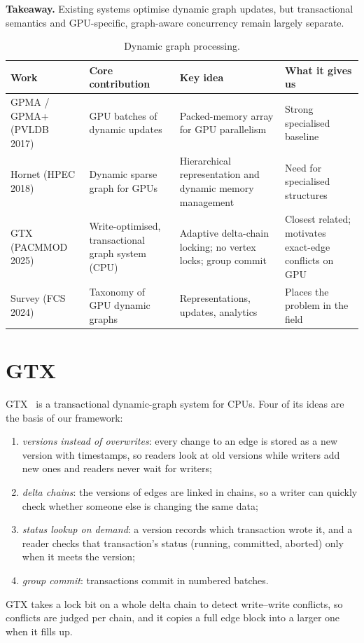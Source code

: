 \documentclass[11pt,a4paper,oneside]{report}
\begin{document}
\textbf{Takeaway.} Existing systems optimise dynamic graph updates, but transactional semantics and GPU-specific,
graph-aware concurrency remain largely separate.

\begin{table}[H]
\caption{Dynamic graph processing.}
\label{tab:dg}
\small
\begin{singlespace}
\begin{tabular}{@{}P{2.9cm}P{3.9cm}P{4.5cm}P{3.4cm}@{}}
\toprule
Work & Core contribution & Key idea & What it gives us \\
\midrule
GPMA / GPMA+ (PVLDB 2017)~\cite{gpma} & GPU batches of dynamic updates & Packed-memory array for GPU parallelism & Strong specialised baseline \\
Hornet (HPEC 2018)~\cite{hornet} & Dynamic sparse graph for GPUs & Hierarchical representation and dynamic memory management & Need for specialised structures \\
GTX (PACMMOD 2025)~\cite{gtx} & Write-optimised, transactional graph system (CPU) & Adaptive delta-chain locking; no vertex locks; group commit & Closest related; motivates exact-edge conflicts on GPU \\
Survey (FCS 2024)~\cite{survey} & Taxonomy of GPU dynamic graphs & Representations, updates, analytics & Places the problem in the field \\
\bottomrule
\end{tabular}
\end{singlespace}
\end{table}

\section{GTX}
GTX~\cite{gtx} is a transactional dynamic-graph system for CPUs. Four of its ideas are the basis of our framework:
\begin{enumerate}
\item \emph{versions instead of overwrites}: every change to an edge is stored as a new version with timestamps, so
  readers look at old versions while writers add new ones and readers never wait for writers;
\item \emph{delta chains}: the versions of edges are linked in chains, so a writer can quickly check whether someone else
  is changing the same data;
\item \emph{status lookup on demand}: a version records which transaction wrote it, and a reader checks that
  transaction's status (running, committed, aborted) only when it meets the version;
\item \emph{group commit}: transactions commit in numbered batches.
\end{enumerate}
GTX takes a lock bit on a whole delta chain to detect write--write conflicts, so conflicts are judged per chain, and it
copies a full edge block into a larger one when it fills up.
\end{document}
